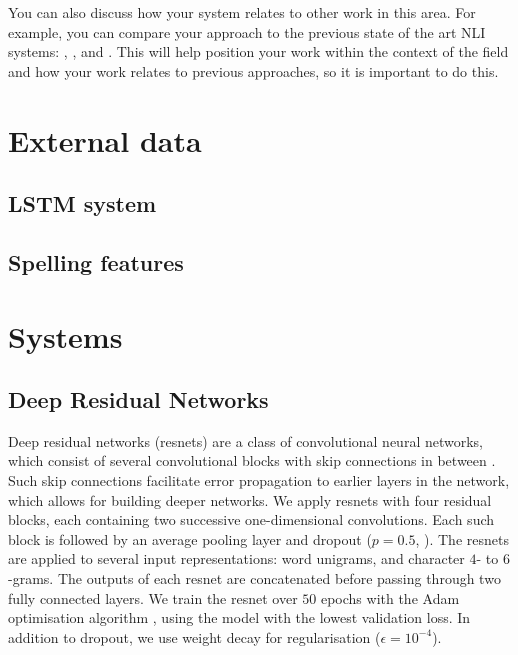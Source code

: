\documentclass[11pt,letterpaper]{article}
\begin{document}
You can also discuss how your system relates to other work in this area. For example, you can compare your approach to the previous state of the art NLI systems: \cite{malmasi:2017:nlisg}, \cite{ionescu:2014}, \cite{bykh:2014} and \cite{jarvis-bestgen-pepper:2013:BEA8}.
This will help position your work within the context of the field and how your work relates to previous approaches, so it is important to do this.

\section{External data}
\subsection{LSTM system}

\subsection{Spelling features}

\section{Systems}
\subsection{Deep Residual Networks}

Deep residual networks (resnets) are a class of convolutional neural networks, which consist of several convolutional blocks with skip connections in between \citep{He2016identity}.
Such skip connections facilitate error propagation to earlier layers in the network, which allows for building deeper networks.
We apply resnets with four residual blocks, each containing two successive one-dimensional convolutions.
Each such block is followed by an average pooling layer and dropout ($p=0.5$, \citet{dropout}).
The resnets are applied to several input representations: word unigrams, and character $4$- to $6$-grams.
The outputs of each resnet are concatenated before passing through two fully connected layers.
We train the resnet over $50$ epochs with the Adam optimisation algorithm \citep{adam}, using the model with the lowest validation loss.
In addition to dropout, we use weight decay for regularisation ($\epsilon=10^{-4}$).
\end{document}
